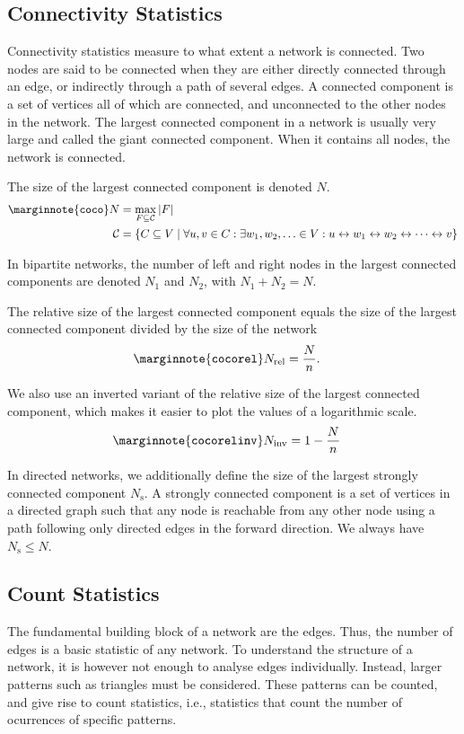 \documentclass{article}
\begin{document}
\subsection{Connectivity Statistics}
Connectivity statistics measure to what extent a network is
connected. 
Two nodes are said to be connected when they are either directly
connected through an edge, or indirectly through a path of several
edges. 
A connected component is a set of vertices all of which are connected,
and unconnected to the other nodes in the network.  
The largest connected component in a network is usually very large and
called the giant connected component. When it contains all nodes, the
network is connected. 

The size of the largest connected component is denoted 
$N$.  
\begin{align}
  \marginnote{\texttt{coco}}
  N &= \max_{F \subseteq \mathcal C} |F|  \\
  \mathcal C &= \{ C \subseteq V \mid \forall u, v \in C:  \exists w_1,
  w_2, \ldots \in V:  u \leftrightarrow w_1 \leftrightarrow w_2 \leftrightarrow \cdots \leftrightarrow v \} \nonumber
\end{align}

In bipartite networks, the number of left and right nodes in the largest
connected components are denoted $N_1$ and $N_2$,
with $N_1 + N_2 = N$. 

The relative size of the largest connected component equals the
size of the largest connected component divided by the size of the
network
\begin{align}
  \marginnote{\texttt{cocorel}}
  N_{\mathrm{rel}} &= \frac N n. 
\end{align}

We also use an inverted variant of the relative size of the largest
connected component, which makes it easier to plot the values of a
logarithmic scale.
\begin{align}
  \marginnote{\texttt{cocorelinv}}
  N_{\mathrm{inv}} &= 1 - \frac N n 
\end{align}

In directed networks, we additionally define the size of the largest
strongly connected component $N_{\mathrm s}$.  A strongly
connected component is a 
set of vertices in a directed graph such that any node is reachable from
any other node using a path following only directed edges in the forward
direction.   We always have $N_{\mathrm s} \leq N$. 

\subsection{Count Statistics}
\label{sec:count-statistics}
The fundamental building block of a network are the edges.  Thus, the
number of edges is a basic statistic of any network.  To understand the
structure of a network, it is however not enough to analyse edges
individually.  Instead, larger patterns such as triangles must be
considered.  These patterns can be counted, and give rise to count
statistics, i.e., statistics that count the number of ocurrences of
specific patterns. 
\end{document}
